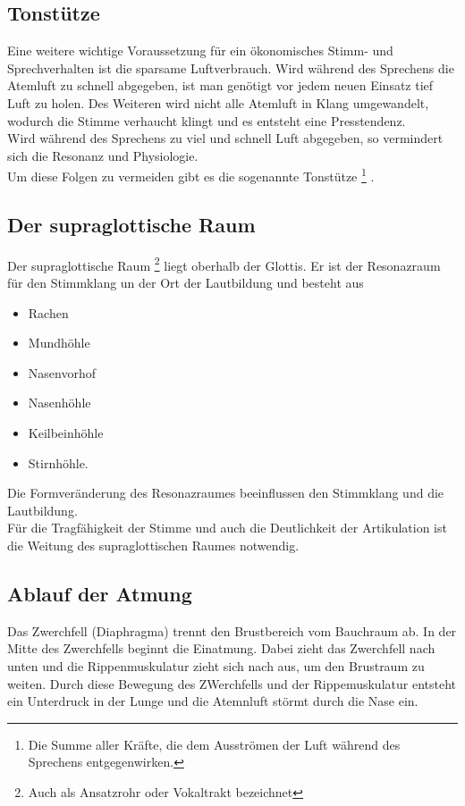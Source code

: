 \documentclass[ngerman, a4paper, twoside]{scrbook}%
\begin{document}
	\subsection{Tonstütze}
	Eine weitere wichtige Voraussetzung für ein ökonomisches Stimm- und Sprechverhalten ist die sparsame Luftverbrauch. Wird während des Sprechens die Atemluft zu schnell abgegeben, ist man genötigt vor jedem neuen Einsatz tief Luft zu holen. Des Weiteren wird nicht alle Atemluft in Klang umgewandelt, wodurch die Stimme verhaucht klingt und es entsteht eine Presstendenz.\\

	Wird während des Sprechens zu viel und schnell Luft abgegeben, so vermindert sich die Resonanz und Physiologie.\\
	Um diese Folgen zu vermeiden gibt es die sogenannte Tonstütze
	\footnote{Die Summe aller Kräfte, die dem Ausströmen der Luft während des Sprechens entgegenwirken.}
	.

	\subsection{Der supraglottische Raum}
	Der supraglottische Raum
	\footnote{Auch als Ansatzrohr oder Vokaltrakt bezeichnet}
	liegt oberhalb der Glottis. Er ist der Resonazraum für den Stimmklang un der Ort der Lautbildung und besteht aus
	\begin{itemize}
		\item Rachen
		\item Mundhöhle
		\item Nasenvorhof
		\item Nasenhöhle
		\item Keilbeinhöhle
		\item Stirnhöhle.
	\end{itemize}
	 Die Formveränderung des Resonazraumes beeinflussen den Stimmklang und die Lautbildung.\\
	Für die Tragfähigkeit der Stimme und auch die Deutlichkeit der Artikulation ist die Weitung des supraglottischen Raumes notwendig.

	\subsection{Ablauf der Atmung}
	Das Zwerchfell (Diaphragma) trennt den Brustbereich vom Bauchraum ab. In der Mitte des Zwerchfells beginnt die Einatmung. Dabei zieht das Zwerchfell nach unten und die Rippenmuskulatur zieht sich nach aus, um den Brustraum zu weiten. Durch diese Bewegung des ZWerchfells und der Rippemuskulatur entsteht ein Unterdruck in der Lunge und die Atemnluft störmt durch die Nase ein.\\
\end{document}
